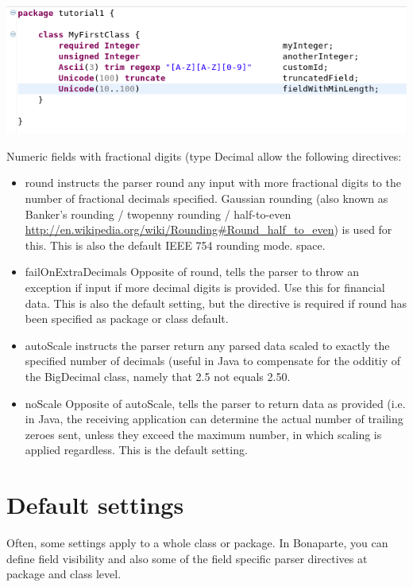 \documentclass[11pt,a4paper,oneside]{article}
\begin{document}
\hspace{1cm}\includegraphics[scale=0.5]{images/tut1-005.png}

Numeric fields with fractional digits (type {\ttfamily Decimal} allow the following directives:
\begin{itemize}
  \item {\ttfamily round} instructs the parser round any input with more fractional digits to the number of fractional decimals
  specified. Gaussian rounding (also known as Banker's rounding / twopenny rounding / half-to-even
  \url{http://en.wikipedia.org/wiki/Rounding#Round_half_to_even}) is used for this. This is also the default IEEE 754 rounding
  mode. space.
  \item {\ttfamily failOnExtraDecimals} Opposite of {\ttfamily round}, tells the parser to throw an exception if input if more
  decimal digits is provided. Use this for financial data. This is also the default setting, but the directive is required if
  {\ttfamily round} has been specified as package or class default.
  \item {\ttfamily autoScale} instructs the parser return any parsed data scaled to exactly the specified number of decimals
  (useful in Java to compensate for the odditiy of the {\ttfamily BigDecimal} class, namely that 2.5 not equals 2.50.
  \item {\ttfamily noScale} Opposite of {\ttfamily autoScale}, tells the parser to return data as provided (i.e. in Java,
  the receiving application can determine the actual number of trailing zeroes sent, unless they exceed the maximum number, in
  which scaling is applied regardless. This is the default setting.
\end{itemize}

\section{Default settings}
Often, some settings apply to a whole class or package. 
In Bonaparte, you can define field visibility and also some of the field specific parser directives at package and class level.
\end{document}
